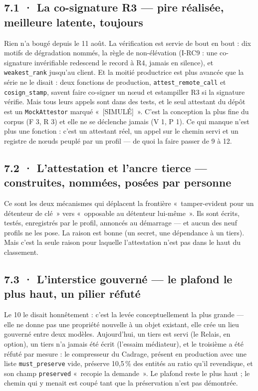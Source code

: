 \documentclass[10pt]{article}
\newcommand{\code}[1]{\texttt{\small #1}}
\newcommand{\pc}{\,\%}
\begin{document}
\subsection{7.1 · La co-signature R3 --- pire réalisée, meilleure latente, toujours}

Rien n'a bougé depuis le 11 août. La vérification est servie de bout en bout : dix motifs de dégradation nommés, la
règle de non-élévation (I-RC9 : une co-signature invérifiable redescend le record à R4, jamais en silence), et
\code{weakest\_rank} jusqu'au client. Et la moitié productrice est plus avancée que la série ne le disait : deux
fonctions de production, \code{attest\_remote\_call} et \code{cosign\_stamp}, savent faire co-signer un nœud et estampiller
R3 si la signature vérifie. Mais tous leurs appels sont dans des tests, et le seul attestant du dépôt est un
\code{MockAttestor} marqué «~[SIMULÉ]~». C'est la conception la plus fine du corpus (F 3, R 3) et elle ne se déclenche
jamais (V 1, P 1). Ce qui manque n'est plus une fonction : c'est un attestant réel, un appel sur le chemin servi et un
registre de nœuds peuplé par un profil --- de quoi la faire passer de 9 à 12.

\subsection{7.2 · L'attestation et l'ancre tierce --- construites, nommées, posées par personne}

Ce sont les deux mécanismes qui déplacent la frontière «~tamper-evident pour un détenteur de clé~» vers «~opposable au
détenteur lui-même~». Ils sont écrits, testés, enregistrés par le profil, annoncés au démarrage --- et aucun des neuf
profils ne les pose. La raison est bonne (un secret, une dépendance à un tiers). Mais c'est la seule raison pour
laquelle l'attestation n'est pas dans le haut du classement.

\subsection{7.3 · L'interstice gouverné --- le plafond le plus haut, un pilier réfuté}

Le 10 le disait honnêtement : c'est la levée conceptuellement la plus grande --- elle ne donne pas une propriété
nouvelle à un objet existant, elle crée un lieu gouverné entre deux modèles. Aujourd'hui, un tiers est servi (le
Relais, en option), un tiers n'a jamais été écrit (l'essaim médiateur), et le troisième a été réfuté par mesure : le
compresseur du Cadrage, présent en production avec une liste \code{must\_preserve} vide, préserve 10,5\pc{} des
entités au ratio qu'il revendique, et son champ \code{preserved} «~recopie la demande~». Le plafond reste le plus
haut ; le chemin qui y menait est coupé tant que la préservation n'est pas démontrée.
\end{document}
